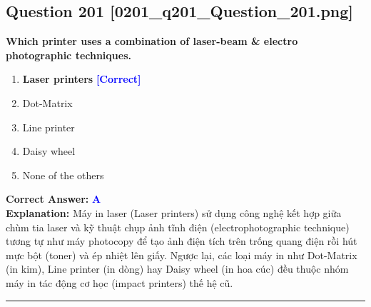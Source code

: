 \documentclass[11pt,a4paper]{article}
\begin{document}
\begin{minipage}{\textwidth}
\subsection*{Question 201 \quad \footnotesize{[0201\_q201\_Question\_201.png]}}
\noindent \textbf{Which printer uses a combination of laser-beam \& electro photographic techniques.}

\begin{enumerate}[label=\Alph*.]
    \item \textbf{Laser printers} \hfill \textcolor{blue}{\textbf{[Correct]}}
    \item Dot-Matrix
    \item Line printer
    \item Daisy wheel
    \item None of the others
\end{enumerate}

\noindent \textbf{Correct Answer:} \textcolor{blue}{\textbf{A}} \\[2pt]
\noindent \textbf{Explanation:} Máy in laser (Laser printers) sử dụng công nghệ kết hợp giữa chùm tia laser và kỹ thuật chụp ảnh tĩnh điện (electrophotographic technique) tương tự như máy photocopy để tạo ảnh điện tích trên trống quang điện rồi hút mực bột (toner) và ép nhiệt lên giấy. Ngược lại, các loại máy in như Dot-Matrix (in kim), Line printer (in dòng) hay Daisy wheel (in hoa cúc) đều thuộc nhóm máy in tác động cơ học (impact printers) thế hệ cũ.

\par\vspace{0.3cm}
\hrule
\vspace{0.3cm}
\end{minipage}
\end{document}
